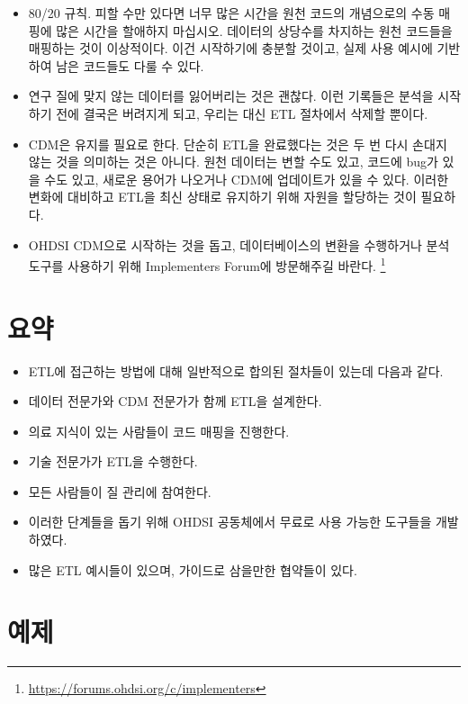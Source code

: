 \documentclass[11pt]{book}
\providecommand{\tightlist}{%
  \setlength{\itemsep}{0pt}\setlength{\parskip}{0pt}}
\let\rmarkdownfootnote\footnote%
\def\footnote{\protect\rmarkdownfootnote}
\theoremstyle{definition}
\theoremstyle{definition}
\theoremstyle{definition}
\theoremstyle{remark}
\let\BeginKnitrBlock\begin \let\EndKnitrBlock\end
\begin{document}
\begin{itemize}
\tightlist
\item
  80/20 규칙. 피할 수만 있다면 너무 많은 시간을 원천 코드의 개념으로의
  수동 매핑에 많은 시간을 할애하지 마십시오. 데이터의 상당수를 차지하는
  원천 코드들을 매핑하는 것이 이상적이다. 이건 시작하기에 충분할 것이고,
  실제 사용 예시에 기반하여 남은 코드들도 다룰 수 있다.
\item
  연구 질에 맞지 않는 데이터를 잃어버리는 것은 괜찮다. 이런 기록들은
  분석을 시작하기 전에 결국은 버려지게 되고, 우리는 대신 ETL 절차에서
  삭제할 뿐이다.
\item
  CDM은 유지를 필요로 한다. 단순히 ETL을 완료했다는 것은 두 번 다시
  손대지 않는 것을 의미하는 것은 아니다. 원천 데이터는 변할 수도 있고,
  코드에 bug가 있을 수도 있고, 새로운 용어가 나오거나 CDM에 업데이트가
  있을 수 있다. 이러한 변화에 대비하고 ETL을 최신 상태로 유지하기 위해
  자원을 할당하는 것이 필요하다.
\item
  OHDSI CDM으로 시작하는 것을 돕고, 데이터베이스의 변환을 수행하거나
  분석 도구를 사용하기 위해 Implementers Forum에 방문해주길 바란다.
  \footnote{\url{https://forums.ohdsi.org/c/implementers}}
\end{itemize}

\section{요약}\label{-4}

\BeginKnitrBlock{rmdsummary}
\begin{itemize}
\item
  ETL에 접근하는 방법에 대해 일반적으로 합의된 절차들이 있는데 다음과
  같다.
\item
  데이터 전문가와 CDM 전문가가 함께 ETL을 설계한다.
\item
  의료 지식이 있는 사람들이 코드 매핑을 진행한다.
\item
  기술 전문가가 ETL을 수행한다.
\item
  모든 사람들이 질 관리에 참여한다.
\item
  이러한 단계들을 돕기 위해 OHDSI 공동체에서 무료로 사용 가능한 도구들을
  개발하였다.
\item
  많은 ETL 예시들이 있으며, 가이드로 삼을만한 협약들이 있다.
\end{itemize}
\EndKnitrBlock{rmdsummary}

\section{예제}\label{-1}
\end{document}
